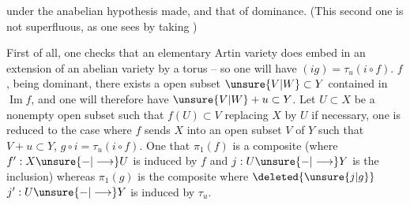 under the anabelian hypothesis made, and that of dominance. (This second one is not superfluous, as one sees by taking  )

First of all, one checks that an elementary Artin variety does embed  in an extension of an abelian variety by a torus -- so one will have $(ig)=\tau_u(i\circ f)$.    $f$, being dominant, there exists a  open subset $\unsure{V|W}\subset Y$ contained in $\operatorname{Im}f$, and one will therefore have $\unsure{V|W}+u\subset Y$. Let $U\subset X$ be a nonempty open subset such that $f(U)\subset V$   replacing $X$ by $U$ if necessary, one is reduced to the case where $f$ sends $X$ into an open subset $V$ of $Y$ such that $V+u\subset Y$,  $g\circ i=\tau_u(i\circ f)$. One   that $\pi_1(f)$ is a composite (where $f':X\unsure{-|\longrightarrow}U$ is  induced by $f$ and $j:U\unsure{-|\longrightarrow}Y$ is the inclusion)
whereas $\pi_1(g)$ is the composite
where $\deleted{\unsure{j|g}}$ $j':U\unsure{-|\longrightarrow}Y$ is induced by $\tau_u$.
